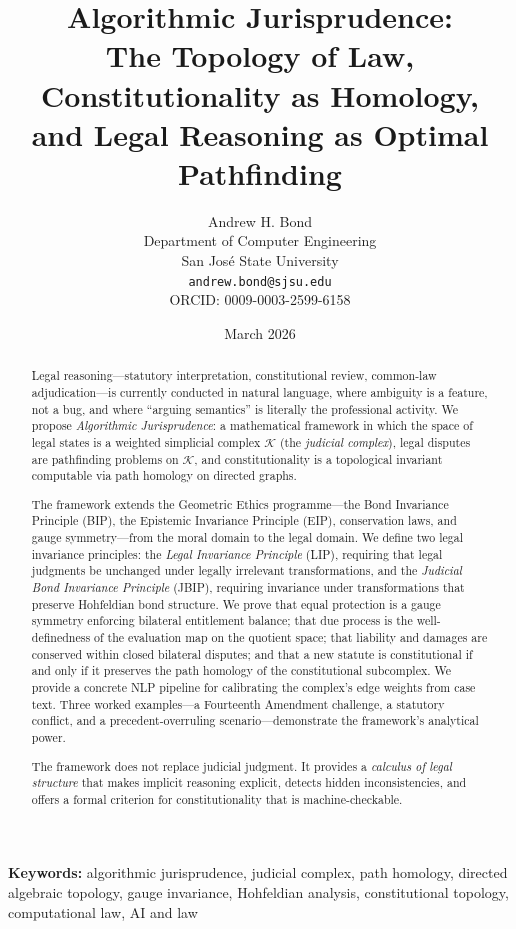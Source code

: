 \documentclass[12pt]{article}
\title{\textbf{Algorithmic Jurisprudence:\\The Topology of Law, Constitutionality as Homology,\\and Legal Reasoning as Optimal Pathfinding}}
\author{Andrew H. Bond\\
Department of Computer Engineering\\
San Jos\'{e} State University\\
\texttt{andrew.bond@sjsu.edu}\\
ORCID: 0009-0003-2599-6158}
\date{March 2026}
\theoremstyle{definition}
\theoremstyle{remark}
\begin{document}
\maketitle

\noindent\textbf{Keywords:} algorithmic jurisprudence, judicial complex, path homology, directed algebraic topology, gauge invariance, Hohfeldian analysis, constitutional topology, computational law, AI and law

\begin{abstract}
Legal reasoning---statutory interpretation, constitutional review, common-law adjudication---is currently conducted in natural language, where ambiguity is a feature, not a bug, and where ``arguing semantics'' is literally the professional activity.  We propose \emph{Algorithmic Jurisprudence}: a mathematical framework in which the space of legal states is a weighted simplicial complex $\mathcal{K}$ (the \emph{judicial complex}), legal disputes are pathfinding problems on $\mathcal{K}$, and constitutionality is a topological invariant computable via path homology on directed graphs.

The framework extends the Geometric Ethics programme---the Bond Invariance Principle (BIP), the Epistemic Invariance Principle (EIP), conservation laws, and gauge symmetry---from the moral domain to the legal domain.  We define two legal invariance principles: the \emph{Legal Invariance Principle} (LIP), requiring that legal judgments be unchanged under legally irrelevant transformations, and the \emph{Judicial Bond Invariance Principle} (JBIP), requiring invariance under transformations that preserve Hohfeldian bond structure.  We prove that equal protection is a gauge symmetry enforcing bilateral entitlement balance; that due process is the well-definedness of the evaluation map on the quotient space; that liability and damages are conserved within closed bilateral disputes; and that a new statute is constitutional if and only if it preserves the path homology of the constitutional subcomplex.  We provide a concrete NLP pipeline for calibrating the complex's edge weights from case text.  Three worked examples---a Fourteenth Amendment challenge, a statutory conflict, and a precedent-overruling scenario---demonstrate the framework's analytical power.

The framework does not replace judicial judgment.  It provides a \emph{calculus of legal structure} that makes implicit reasoning explicit, detects hidden inconsistencies, and offers a formal criterion for constitutionality that is machine-checkable.
\end{abstract}
\end{document}
